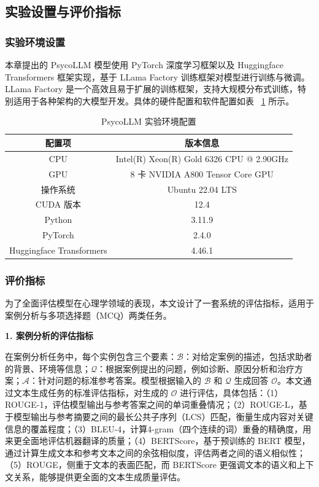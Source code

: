 \subsection{实验设置与评价指标}

\subsubsection{实验环境设置}

本章提出的 PsycoLLM 模型使用 PyTorch 深度学习框架以及 Huggingface Transformers 框架实现，基于 LLama Factory 训练框架对模型进行训练与微调。LLama Factory 是一个高效且易于扩展的训练框架，支持大规模分布式训练，特别适用于各种架构的大模型开发。具体的硬件配置和软件配置如表 ~\ref{tab:work1-实验环境配置} 所示。

\begin{table}
  \centering
  \caption{PsycoLLM 实验环境配置}
  \label{tab:work1-实验环境配置}
  \begin{tabular}{cc}
    \toprule
    配置项 & 版本信息 \\
    \midrule
    CPU & Intel(R) Xeon(R) Gold 6326 CPU @ 2.90GHz \\
    GPU & 8 卡 NVIDIA A800 Tensor Core GPU \\
    操作系统 & Ubuntu 22.04 LTS \\
    CUDA 版本 & 12.4 \\
    Python & 3.11.9 \\
    PyTorch & 2.4.0 \\
    Huggingface Transformers & 4.46.1 \\
    \bottomrule
  \end{tabular}
\end{table}

\subsubsection{评价指标}

为了全面评估模型在心理学领域的表现，本文设计了一套系统的评估指标，适用于案例分析与多项选择题（MCQ）两类任务。

\textbf{1. 案例分析的评估指标}

在案例分析任务中，每个实例包含三个要素：$\mathcal{B}$：对给定案例的描述，包括求助者的背景、环境等信息；$\mathcal{Q}$：根据案例提出的问题，例如诊断、原因分析和治疗方案；$\mathcal{A}$：针对问题的标准参考答案。模型根据输入的 $\mathcal{B}$ 和 $\mathcal{Q}$ 生成回答 $\mathcal{O}$。本文通过文本生成任务的标准评估指标，对生成的 $\mathcal{O}$ 进行评估，具体包括：（1）ROUGE-1，评估模型输出与参考答案之间的单词重叠情况；（2）ROUGE-L，基于模型输出与参考摘要之间的最长公共子序列（LCS）匹配，衡量生成内容对关键信息的覆盖程度；（3）BLEU-4，计算4-gram（四个连续的词）重叠的精确度，用来更全面地评估机器翻译的质量；（4）BERTScore，基于预训练的 BERT 模型，通过计算生成文本和参考文本之间的余弦相似度，评估两者之间的语义相似性；（5）ROUGE，侧重于文本的表面匹配，而 BERTScore 更强调文本的语义和上下文关系，能够提供更全面的文本生成质量评估。

